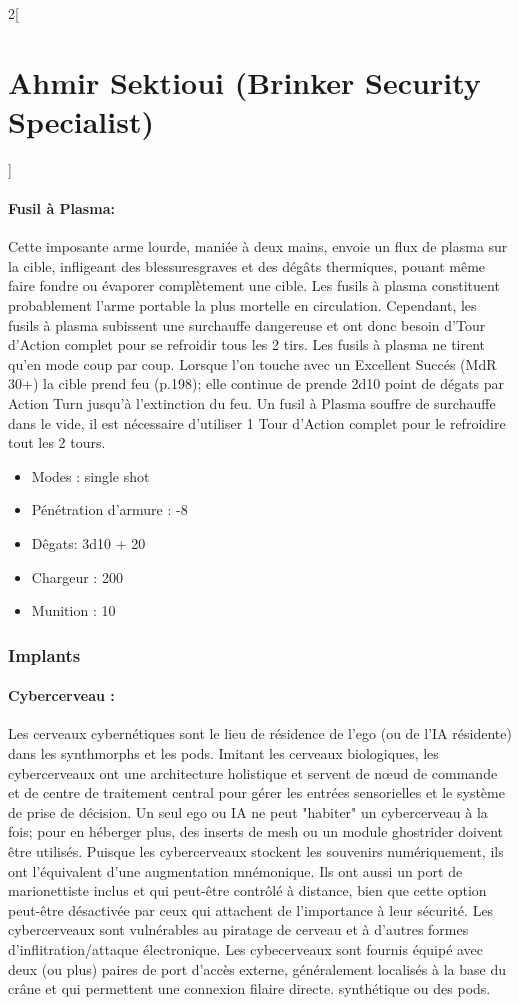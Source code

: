 \documentclass[a4paper,9pt]{article}
\begin{document}
\begin{multicols}{2}[\section*{Ahmir Sektioui (Brinker Security Specialist)}]
   \paragraph{Fusil à Plasma:} Cette imposante arme lourde, maniée à deux mains,
   envoie un flux de plasma sur la cible, infligeant des blessuresgraves et des
   dégâts thermiques, pouant même faire fondre ou évaporer complètement une cible.
   Les fusils à plasma constituent probablement l'arme portable la plus mortelle
   en circulation. Cependant, les fusils à plasma subissent une surchauffe
   dangereuse et ont donc besoin d'Tour d'Action complet pour se refroidir tous
   les 2 tirs. Les fusils à plasma ne tirent qu'en mode coup par coup.  Lorsque
   l'on touche avec un Excellent Succés (MdR 30+) la cible prend feu (p.198); elle
   continue de prende 2d10 point de dégats par Action Turn jusqu'à l'extinction du
   feu. Un fusil à Plasma souffre de surchauffe dans le vide, il est nécessaire
   d'utiliser 1 Tour d'Action complet pour le refroidire tout les 2
   tours.

   \begin{itemize}
      \item Modes : single shot
      \item Pénétration d'armure : -8
      \item Dêgats: 3d10 + 20
      \item Chargeur : 200
      \item Munition : 10
   \end{itemize}

   \subsubsection*{Implants}

   \paragraph{Cybercerveau :} 
   Les cerveaux cybernétiques sont le lieu de résidence de l'ego (ou de l'IA
   résidente) dans les synthmorphs et les pods. Imitant les cerveaux
   biologiques, les cybercerveaux ont une architecture holistique et servent de
   nœud de commande et de centre de traitement central pour gérer les entrées
   sensorielles et le système de prise de décision. Un seul ego ou IA ne peut
   "habiter" un cybercerveau à la fois; pour en héberger plus, des inserts de
   mesh ou un module ghostrider doivent être utilisés. Puisque les
   cybercerveaux stockent les souvenirs numériquement, ils ont l'équivalent
   d'une augmentation mnémonique. Ils ont aussi un port de marionettiste inclus
   et qui peut-être contrôlé à distance, bien que cette option peut-être
   désactivée par ceux qui attachent de l'importance à leur sécurité. Les
   cybercerveaux sont vulnérables au piratage de cerveau et à d'autres formes
   d'inflitration/attaque électronique. Les cybecerveaux sont fournis équipé
   avec deux (ou plus) paires de port d'accès externe, généralement localisés à
   la base du crâne et qui permettent une connexion filaire directe.
   synthétique ou des pods.


\end{multicols}
\end{document}
